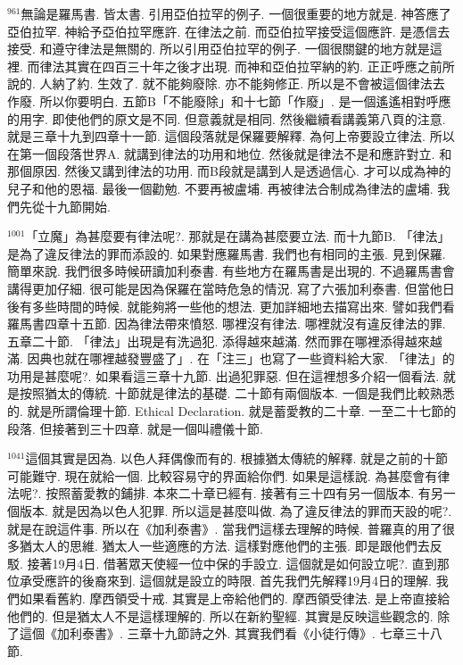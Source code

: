 \documentclass{book}
\begin{document}
$^{961}$無論是羅馬書.
皆太書.
引用亞伯拉罕的例子.
一個很重要的地方就是.
神答應了亞伯拉罕.
神給予亞伯拉罕應許.
在律法之前.
而亞伯拉罕接受這個應許.
是憑信去接受.
和遵守律法是無關的.
所以引用亞伯拉罕的例子.
一個很關鍵的地方就是這裡.
而律法其實在四百三十年之後才出現.
而神和亞伯拉罕納的約.
正正呼應之前所說的.
人納了約.
生效了.
就不能夠廢除.
亦不能夠修正.
所以是不會被這個律法去作廢.
所以你要明白.
五節B「不能廢除」和十七節「作廢」.
是一個遙遙相對呼應的用字.
即使他們的原文是不同.
但意義就是相同.
然後繼續看講義第八頁的注意.
就是三章十九到四章十一節.
這個段落就是保羅要解釋.
為何上帝要設立律法.
所以在第一個段落世界A.
就講到律法的功用和地位.
然後就是律法不是和應許對立.
和那個原因.
然後又講到律法的功用.
而B段就是講到人是透過信心.
才可以成為神的兒子和他的恩福.
最後一個勸勉.
不要再被盧埔.
再被律法合制成為律法的盧埔.
我們先從十九節開始.

$^{1001}$「立魔」為甚麼要有律法呢?.
那就是在講為甚麼要立法.
而十九節B.
「律法」是為了違反律法的罪而添設的.
如果對應羅馬書.
我們也有相同的主張.
見到保羅.
簡單來說.
我們很多時候研讀加利泰書.
有些地方在羅馬書是出現的.
不過羅馬書會講得更加仔細.
很可能是因為保羅在當時危急的情況.
寫了六張加利泰書.
但當他日後有多些時間的時候.
就能夠將一些他的想法.
更加詳細地去描寫出來.
譬如我們看羅馬書四章十五節.
因為律法帶來憤怒.
哪裡沒有律法.
哪裡就沒有違反律法的罪.
五章二十節.
「律法」出現是有洗過犯.
添得越來越滿.
然而罪在哪裡添得越來越滿.
因典也就在哪裡越發豐盛了」.
在「注三」也寫了一些資料給大家.
「律法」的功用是甚麼呢?.
如果看這三章十九節.
出過犯罪惡.
但在這裡想多介紹一個看法.
就是按照猶太的傳統.
十節就是律法的基礎.
二十節有兩個版本.
一個是我們比較熟悉的.
就是所謂倫理十節.
Ethical Declaration.
就是蓄愛教的二十章.
一至二十七節的段落.
但接著到三十四章.
就是一個叫禮儀十節.

$^{1041}$這個其實是因為.
以色人拜偶像而有的.
根據猶太傳統的解釋.
就是之前的十節可能難守.
現在就給一個.
比較容易守的界面給你們.
如果是這樣說.
為甚麼會有律法呢?.
按照蓄愛教的鋪排.
本來二十章已經有.
接著有三十四有另一個版本.
有另一個版本.
就是因為以色人犯罪.
所以這是甚麼叫做.
為了違反律法的罪而天設的呢?.
就是在說這件事.
所以在《加利泰書》.
當我們這樣去理解的時候.
普羅真的用了很多猶太人的思維.
猶太人一些適應的方法.
這樣對應他們的主張.
即是跟他們去反駁.
接著19月4日.
借著眾天使經一位中保的手設立.
這個就是如何設立呢?.
直到那位承受應許的後裔來到.
這個就是設立的時限.
首先我們先解釋19月4日的理解.
我們如果看舊約.
摩西領受十戒.
其實是上帝給他們的.
摩西領受律法.
是上帝直接給他們的.
但是猶太人不是這樣理解的.
所以在新約聖經.
其實是反映這些觀念的.
除了這個《加利泰書》.
三章十九節詩之外.
其實我們看《小徒行傳》.
七章三十八節.
\end{document}
